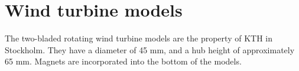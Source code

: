 \section{Wind turbine models}
The two-bladed rotating wind turbine models are the property of KTH in Stockholm. They have a diameter of 45 mm, and a hub height of approximately 65 mm. Magnets are incorporated into the bottom of the models. 





